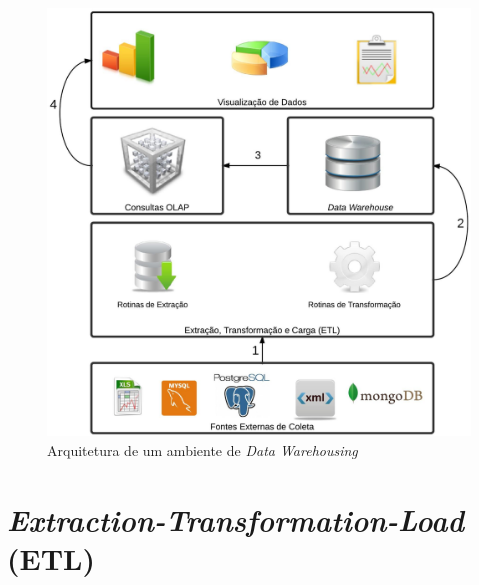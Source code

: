 \begin{figure}[h!]
\centering
	\includegraphics[keepaspectratio=true,scale=0.20]{figuras/Dwing.eps}
	\caption{Arquitetura de um ambiente de \textit{Data Warehousing}}
	\label{dwing}
\end{figure}
\FloatBarrier

\section{\textit{Extraction-Transformation-Load} (ETL)}

